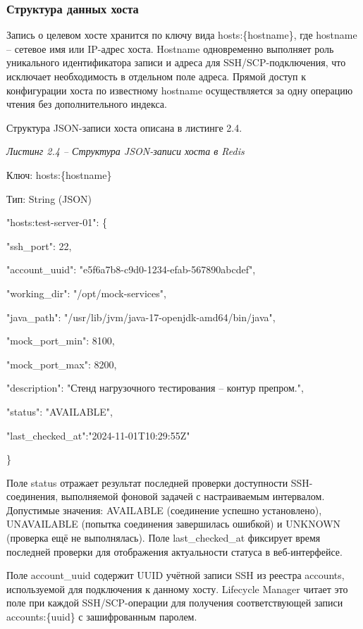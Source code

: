 \documentclass[
]{article}
\begin{document}
\subsubsection{Структура данных
хоста}\label{ux441ux442ux440ux443ux43aux442ux443ux440ux430-ux434ux430ux43dux43dux44bux445-ux445ux43eux441ux442ux430}

Запись о целевом хосте хранится по ключу вида hosts:\{hostname\}, где
hostname -- сетевое имя или IP-адрес хоста. Hostname одновременно
выполняет роль уникального идентификатора записи и адреса для
SSH/SCP-подключения, что исключает необходимость в отдельном поле
адреса. Прямой доступ к конфигурации хоста по известному hostname
осуществляется за одну операцию чтения без дополнительного индекса.

Структура JSON-записи хоста описана в листинге 2.4.

\emph{Листинг 2.4 -- Структура JSON-записи хоста в Redis}

Ключ: hosts:\{hostname\}

Тип: String (JSON)

"hosts:test-server-01": \{

"ssh\_port": 22,

"account\_uuid": "e5f6a7b8-c9d0-1234-efab-567890abcdef",

"working\_dir": "/opt/mock-services",

"java\_path": "/usr/lib/jvm/java-17-openjdk-amd64/bin/java",

"mock\_port\_min": 8100,

"mock\_port\_max": 8200,

"description": "Стенд нагрузочного тестирования -- контур препром.",

"status": "AVAILABLE",

"last\_checked\_at":"2024-11-01T10:29:55Z"

\}

Поле status отражает результат последней проверки доступности
SSH-соединения, выполняемой фоновой задачей с настраиваемым интервалом.
Допустимые значения: AVAILABLE (соединение успешно установлено),
UNAVAILABLE (попытка соединения завершилась ошибкой) и UNKNOWN (проверка
ещё не выполнялась). Поле last\_checked\_at фиксирует время последней
проверки для отображения актуальности статуса в веб-интерфейсе.

Поле account\_uuid содержит UUID учётной записи SSH из реестра accounts,
используемой для подключения к данному хосту. Lifecycle Manager читает
это поле при каждой SSH/SCP-операции для получения соответствующей
записи accounts:\{uuid\} с зашифрованным паролем.
\end{document}
